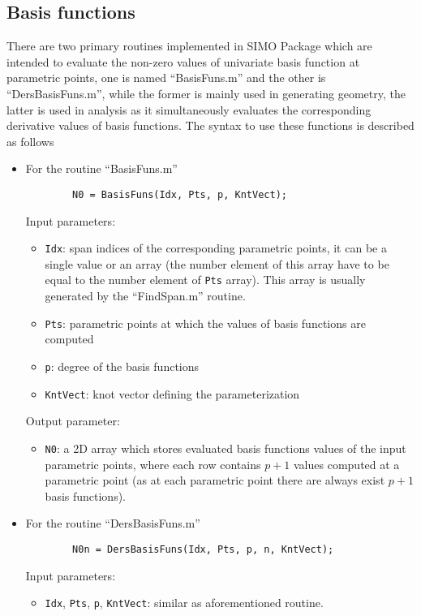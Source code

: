 \subsection{Basis functions}
There are two primary routines implemented in SIMO Package which are intended to evaluate the non-zero values of univariate basis function at parametric points, one is named ``BasisFuns.m'' and the other is ``DersBasisFuns.m'', while the former is mainly used in generating geometry, the latter is used in analysis as it simultaneously evaluates the corresponding derivative values of basis functions. The syntax to use these functions is described as follows
\begin{itemize}
    \item For the routine ``BasisFuns.m''
    \begin{lstlisting}
        N0 = BasisFuns(Idx, Pts, p, KntVect);
    \end{lstlisting}
    Input parameters:
    \begin{itemize}
        \item \lstinline{Idx}: span indices of the corresponding parametric points, it can be a single value or an array (the number element of this array have to be equal to the number element of \lstinline{Pts} array). This array is usually generated by the ``FindSpan.m'' routine.
        \item \lstinline{Pts}: parametric points at which the values of basis functions are computed
        \item \lstinline{p}: degree of the basis functions
        \item \lstinline{KntVect}: knot vector defining the parameterization
    \end{itemize}
    Output parameter:
    \begin{itemize}
        \item \lstinline{N0}: a 2D array which stores evaluated basis functions values of the input parametric points, where each row contains $p + 1$ values computed at a parametric point (as at each parametric point there are always exist $p + 1$ basis functions).
    \end{itemize}
    \item For the routine ``DersBasisFuns.m''
    \begin{lstlisting}
        N0n = DersBasisFuns(Idx, Pts, p, n, KntVect);
    \end{lstlisting}
    Input parameters:
    \begin{itemize}
        \item \lstinline{Idx}, \lstinline{Pts}, \lstinline{p}, \lstinline{KntVect}: similar as aforementioned routine.

\end{itemize}
\end{itemize}

